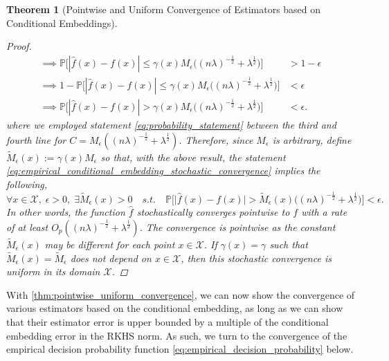 \documentclass{article}
\newtheorem{theorem}{Theorem}[section]
\begin{document}
\begin{theorem}[Pointwise and Uniform Convergence of Estimators based on Conditional Embeddings]
\begin{proof}
\begin{equation}
\begin{aligned}
			\implies \mathbb{P}\Big[| \hat{f}(x) - f(x) | \leq \gamma(x) M_{\epsilon} \Big((n \lambda)^{-\frac{1}{2}} + \lambda^{\frac{1}{2}}\Big)\Big] &> 1 -  \epsilon \\
			\implies 1 - \mathbb{P}\Big[| \hat{f}(x) - f(x) | \leq \gamma(x) M_{\epsilon} \Big((n \lambda)^{-\frac{1}{2}} + \lambda^{\frac{1}{2}}\Big)\Big] &< \epsilon \\
			\implies \mathbb{P}\Big[| \hat{f}(x) - f(x) | > \gamma(x) M_{\epsilon} \Big((n \lambda)^{-\frac{1}{2}} + \lambda^{\frac{1}{2}}\Big)\Big] &< \epsilon.
			\end{aligned}	
			\end{equation}
			where we employed statement \eqref{eq:probability_statement} between the third and fourth line for $C = M_{\epsilon} ((n \lambda)^{-\frac{1}{2}} + \lambda^{\frac{1}{2}})$. Therefore, since $M_{\epsilon}$ is arbitrary, define $\tilde{M}_{\epsilon}(x) := \gamma(x) M_{\epsilon}$ so that, with the above result, the statement \eqref{eq:empirical_conditional_embedding_stochastic_convergence} implies the following,
			\begin{equation}
				\forall x \in \mathcal{X}, \; \epsilon > 0, \; \exists \tilde{M}_{\epsilon}(x) > 0 \quad s.t. \quad \mathbb{P}\Big[\big| \hat{f}(x) - f(x) \big| > \tilde{M}_{\epsilon}(x) \Big((n \lambda)^{-\frac{1}{2}} + \lambda^{\frac{1}{2}}\Big)\Big] < \epsilon.
			\end{equation}
			In other words, the function $\hat{f}$ stochastically converges pointwise to $f$ with a rate of at least $O_{p}((n \lambda)^{-\frac{1}{2}} + \lambda^{\frac{1}{2}})$. The convergence is pointwise as the constant $\tilde{M}_{\epsilon}(x)$ may be different for each point $x \in \mathcal{X}$. If $\gamma(x) = \gamma$ such that $\tilde{M}_{\epsilon}(x) = \tilde{M}_{\epsilon}$ does not depend on $x \in \mathcal{X}$, then this stochastic convergence is uniform in its domain $\mathcal{X}$.
		\end{proof}

	\end{theorem}
	
	With \cref{thm:pointwise_uniform_convergence}, we can now show the convergence of various estimators based on the conditional embedding, as long as we can show that their estimator error is upper bounded by a multiple of the conditional embedding error in the RKHS norm. As such, we turn to the convergence of the empirical decision probability function \eqref{eq:empirical_decision_probability} below.
\end{document}
